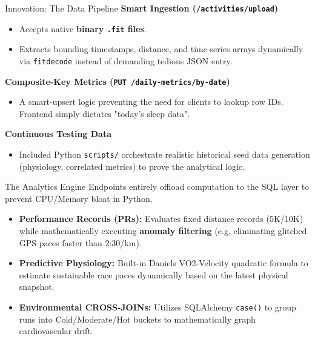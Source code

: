 \documentclass[mathserif,aspectratio=169]{beamer}
\begin{document}
\begin{frame}{Innovation: The Data Pipeline}
    \textbf{Smart Ingestion (\texttt{/activities/upload})}
    \begin{itemize}
        \item Accepts native \textbf{binary \texttt{.fit} files}.
        \item Extracts bounding timestamps, distance, and time-series arrays dynamically via \texttt{fitdecode} instead of demanding tedious JSON entry.
    \end{itemize}

    \vspace{0.3cm}
    \textbf{Composite-Key Metrics (\texttt{PUT /daily-metrics/by-date})}
    \begin{itemize}
        \item A smart-upsert logic preventing the need for clients to lookup row IDs. Frontend simply dictates "today's sleep data".
    \end{itemize}
    
    \vspace{0.3cm}
    \textbf{Continuous Testing Data}
    \begin{itemize}
        \item Included Python \texttt{scripts/} orchestrate realistic historical seed data generation (physiology, correlated metrics) to prove the analytical logic.
    \end{itemize}
\end{frame}

\begin{frame}{The Analytics Engine}
    Endpoints entirely offload computation to the SQL layer to prevent CPU/Memory bloat in Python.
    
    \vspace{0.2cm}
    \begin{itemize}
        \item \textbf{Performance Records (PRs):} Evaluates fixed distance records (5K/10K) while mathematically executing \textbf{anomaly filtering} (e.g. eliminating glitched GPS paces faster than 2:30/km).
        \item \textbf{Predictive Physiology:} Built-in Daniels VO2-Velocity quadratic formula to estimate sustainable race paces dynamically based on the latest physical snapshot.
        \item \textbf{Environmental CROSS-JOINs:} Utilizes SQLAlchemy \texttt{case()} to group runs into Cold/Moderate/Hot buckets to mathematically graph cardiovascular drift.
    \end{itemize}
\end{frame}
\end{document}
